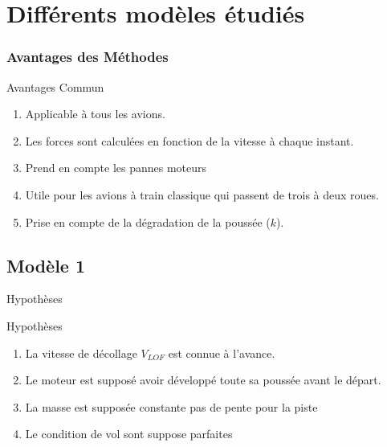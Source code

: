 

\section{Différents modèles étudiés}

\begin{frame}
	\frametitle{Avantages des Méthodes}
	
	\begin{block}{Avantages Commun}
		\begin{enumerate}
			\item Applicable à tous les avions.
			\item Les forces sont calculées en fonction de la vitesse à chaque instant.
			\item Prend en compte les pannes moteurs
			\item Utile pour les avions à train classique qui passent de trois à deux roues.
			\item Prise en compte de la dégradation de la poussée ($k$).
		\end{enumerate}
	\end{block}
	
	
\end{frame}



\subsection{Modèle 1}

	\begin{frame}{Hypothèses}
		\begin{block}{Hypothèses}
			\begin{enumerate}
				\item La vitesse de décollage $V_{LOF}$ est connue à l'avance.
				\item Le moteur est supposé avoir développé toute sa poussée avant le départ.
				\item La masse est supposée constante pas de pente pour la piste
				\item Le condition de vol sont suppose parfaites 
			\end{enumerate}
		\end{block}
		
		
		
		
		
	\end{frame}
	
	
	
